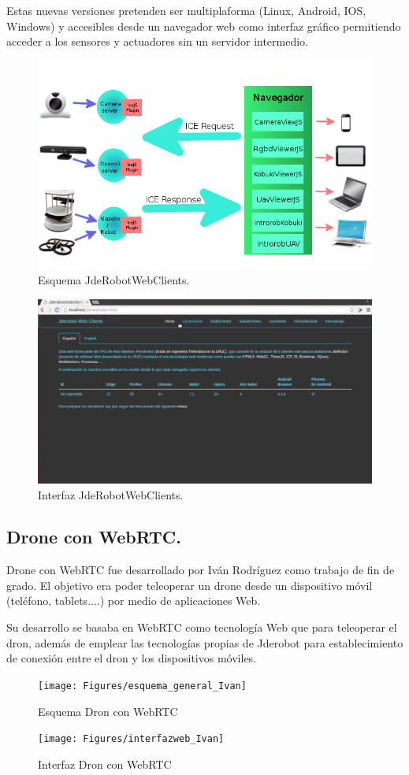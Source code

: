 Estas nuevas versiones pretenden ser multiplaforma (Linux, Android, IOS, Windows) y accesibles desde un navegador web como interfaz gráfico permitiendo acceder a los sensores y actuadores sin un servidor intermedio.
\begin{figure}[!h]
\centering
\includegraphics[width=0.5\linewidth]{Figures/Aitor_esq_proyecto}
\decoRule
\caption[Esquema JdeRobotWebClients]{Esquema JdeRobotWebClients.}
\label{fig:Aitor_esq_proyecto}
\end{figure}
\begin{figure}[!h]
\centering
\includegraphics[width=0.5\linewidth]{Figures/Aitor_esquema_web}
\decoRule
\caption[Interfaz JdeRobotWebClients]{Interfaz JdeRobotWebClients.}
\label{fig:Aitor_esquema_web}
\end{figure}
\subsection*{Drone con WebRTC.}
Drone con WebRTC \cite{TFGDronWebRTC}\cite{DronWebRTC} fue desarrollado por Iván Rodríguez como trabajo de fin de grado. El objetivo era poder teleoperar un drone desde un dispositivo móvil (teléfono, tablets....) por medio de aplicaciones Web.

Su desarrollo se basaba en WebRTC como tecnología Web que para teleoperar el dron, además de emplear las tecnologías propias de Jderobot para establecimiento de conexión entre el dron y los dispositivos móviles.
\begin{figure}[!h]
\centering
\texttt{[image: Figures/esquema\_general\_Ivan]}
\decoRule
\caption[Esquema Dron con WebRTC]{Esquema Dron con WebRTC}
\label{fig:esquema_general_Ivan}
\end{figure}
\begin{figure}[!h]
\centering
\texttt{[image: Figures/interfazweb\_Ivan]}
\decoRule
\caption[Interfaz Dron con WebRTC]{Interfaz Dron con WebRTC}
\label{fig:interfazweb_Ivan}
\end{figure}